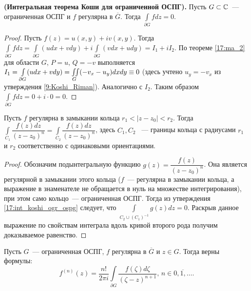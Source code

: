 \begin{statement}\label{17:int_koshi_ogr_ospg}
    \textbf{(Интегральная теорема Коши для ограниченной ОСПГ).} Пусть \(G \subset \mathbb{C}\)~---
    ограниченная ОСПГ и \(f\) регулярна в \(\overline{G}\). Тогда \(\int\limits_{\partial G} f dz =
    0\).
\end{statement}

\begin{proof}
    Пусть \(f(z) = u(x, y) + i v(x, y)\). Тогда \(\int\limits_{\partial G} f dz =
    \int\limits_{\partial G} (udx + vdy) + i \int\limits_{\partial G} (vdx + udy) = I_1 + iI_2\).
    По теореме  \ref{17:ma_2} для области \(G\), \(P=u\), \(Q = -v\) выполняется \(I_1 =
    \int\limits_{\partial G} (udx + vdy) \hm= \iint\limits_G (-v_x -u_y)dxdy \equiv 0\) (здесь учтено
    \(u_y = -v_x\) из утверждения \ref{9:Koshi_Riman}). Аналогично с \(I_2\). Таким образом
    \(\int\limits_{\partial G} f dz = 0 + i \cdot 0 = 0\).
\end{proof}

\begin{example}
    Пусть \(f\) регулярна в замыкании кольца \(r_1 < |z-z_0| < r_2\). Тогда \(\int\limits_{C_1}
    \dfrac{f(z) dz}{(z-z_0)^n} = \int\limits_{C_2} \dfrac{f(z) dz}{(z-z_0)^n}\), здесь \(C_1, C_2\)
    ~--- границы кольца с радиусами \(r_1\) и \(r_2\) соответственно с одинаковыми ориентациями.
\end{example}

\begin{proof}
    Обозначим подынтегральную функцию \(g(z) = \dfrac{f(z)}{(z-z_0)^n}\). Она является регулярной в
    замыкании этого кольца (\(f\)~--- регулярна в замыкании кольца, а выражение в знаменателе не
    обращается в нуль на множестве интегрирования), при этом само кольцо~--- ограниченная ОСПГ.
    Тогда из утверждения \ref{17:int_koshi_ogr_ospg} следует, что \(\int\limits_{C_2 \cup (C_1)^{-1}
    } g(z) dz = 0\). Раскрыв данное выражение по свойствам интеграла вдоль кривой второго рода
    получим доказываемое равенство.
\end{proof}



\begin{statement}\label{18:int_formula}
    Пусть \(G\)~--- ограниченная ОСПГ, \(f\) регулярна в \(\overline{G}\) и \(z \in G\). Тогда верны
    формулы:
    \[f^{(n)}(z) = \dfrac{n!}{2 \pi i} \int\limits_{\partial G}
    \dfrac{f(\zeta) d\zeta}{(\zeta - z)^{n+1}}, \, n \in \overline{0, 1, \dots}.\]
\end{statement}

